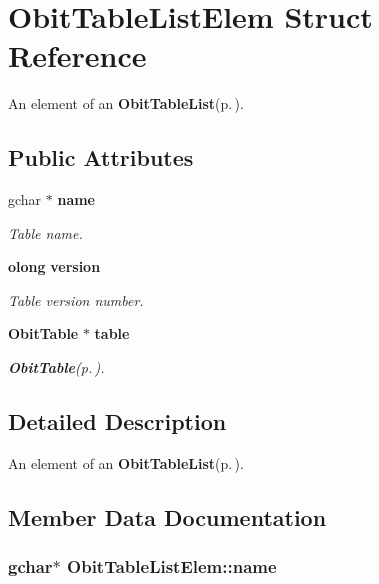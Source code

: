 \section{Obit\-Table\-List\-Elem Struct Reference}
\label{structObitTableListElem}
An element of an {\bf Obit\-Table\-List}{\rm (p.\,\pageref{structObitTableList})}.  


\subsection*{Public Attributes}
\begin{CompactItemize}
\item 
gchar $\ast$ {\bf name}
\begin{CompactList}\small\item\em Table name. \item\end{CompactList}\item 
{\bf olong} {\bf version}
\begin{CompactList}\small\item\em Table version number. \item\end{CompactList}\item 
{\bf Obit\-Table} $\ast$ {\bf table}
\begin{CompactList}\small\item\em {\bf Obit\-Table}{\rm (p.\,\pageref{structObitTable})}. \item\end{CompactList}\end{CompactItemize}


\subsection{Detailed Description}
An element of an {\bf Obit\-Table\-List}{\rm (p.\,\pageref{structObitTableList})}. 



\subsection{Member Data Documentation}
\subsubsection{\setlength{\rightskip}{0pt plus 5cm}gchar$\ast$ {\bf Obit\-Table\-List\-Elem::name}}\label{structObitTableListElem_o0}


